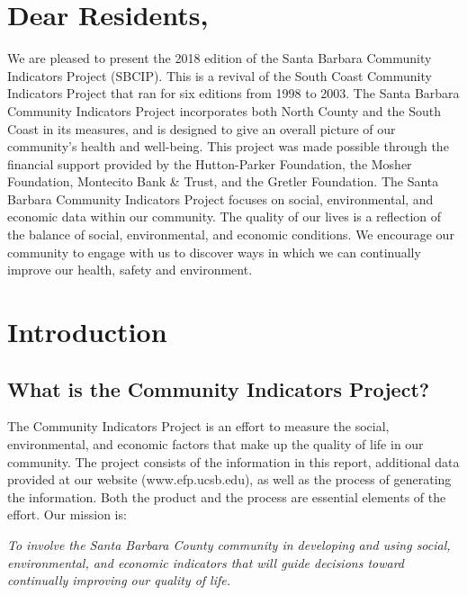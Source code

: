 \documentclass[]{book}
\title{}
\author{}
\date{}
\theoremstyle{definition}
\theoremstyle{definition}
\theoremstyle{definition}
\theoremstyle{remark}
\begin{document}
{
\setcounter{tocdepth}{1}
\tableofcontents
}
\chapter*{Dear Residents,}\label{dear-residents}

We are pleased to present the 2018 edition of the Santa Barbara
Community Indicators Project (SBCIP). This is a revival of the South
Coast Community Indicators Project that ran for six editions from 1998
to 2003. The Santa Barbara Community Indicators Project incorporates
both North County and the South Coast in its measures, and is designed
to give an overall picture of our community's health and well-being.
This project was made possible through the financial support provided by
the Hutton-Parker Foundation, the Mosher Foundation, Montecito Bank \&
Trust, and the Gretler Foundation. The Santa Barbara Community
Indicators Project focuses on social, environmental, and economic data
within our community. The quality of our lives is a reflection of the
balance of social, environmental, and economic conditions. We encourage
our community to engage with us to discover ways in which we can
continually improve our health, safety and environment.

\chapter*{Introduction}\label{introduction}

\section*{What is the Community Indicators
Project?}\label{what-is-the-community-indicators-project}

The Community Indicators Project is an effort to measure the social,
environmental, and economic factors that make up the quality of life in
our community. The project consists of the information in this report,
additional data provided at our website (www.efp.ucsb.edu), as well as
the process of generating the information. Both the product and the
process are essential elements of the effort. Our mission is:

\emph{To involve the Santa Barbara County community in developing and
using social, environmental, and economic indicators that will guide
decisions toward continually improving our quality of life.}
\end{document}
